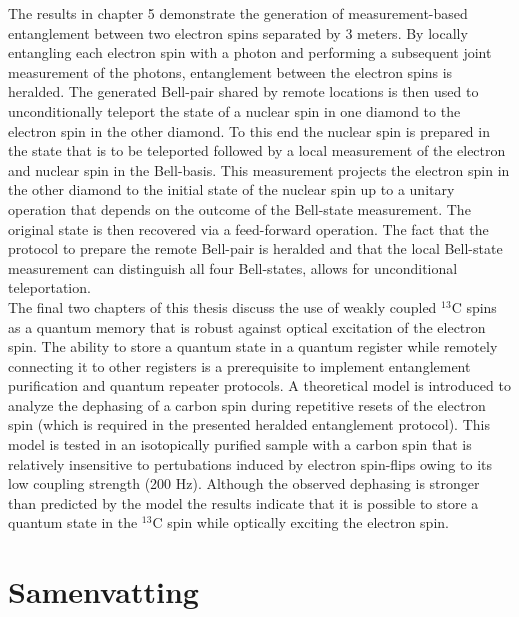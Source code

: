 The results in chapter 5 demonstrate the generation of measurement-based entanglement between two electron spins separated by 3 meters. By locally entangling each electron spin with a photon and performing a subsequent joint measurement of the photons, entanglement between the electron spins is heralded. The generated Bell-pair shared by remote locations is then used to unconditionally teleport the state of a nuclear spin in one diamond to the electron spin in the other diamond. To this end the nuclear spin is prepared in the state that is to be teleported followed by a local measurement of the electron and nuclear spin in the Bell-basis. This measurement projects the electron spin in the other diamond to the initial state of the nuclear spin up to a unitary operation that depends on the outcome of the Bell-state measurement. The original state is then recovered via a feed-forward operation. The fact that the protocol to prepare the remote Bell-pair is heralded and that the local Bell-state measurement can distinguish all four Bell-states, allows for unconditional teleportation. \\

The final two chapters of this thesis discuss the use of weakly coupled $^{13}$C spins as a quantum memory that is robust against optical excitation of the electron spin. The ability to store a quantum state in a quantum register while remotely connecting it to other registers is a prerequisite to implement entanglement purification and quantum repeater protocols. A theoretical model is introduced to analyze the dephasing of a carbon spin during repetitive resets of the electron spin (which is required in the presented heralded entanglement protocol). This model is tested in an isotopically purified sample with a carbon spin that is relatively insensitive to pertubations induced by electron spin-flips owing to its low coupling strength (200 Hz). Although the observed dephasing is stronger than predicted by the model the results indicate that it is possible to store a quantum state in the $^{13}$C spin while optically exciting the electron spin.

\chapter{Samenvatting}

